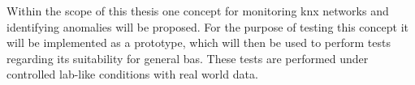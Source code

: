 Within the scope of this thesis one concept for monitoring \gls{knx} networks and identifying anomalies will be proposed. For the purpose of testing this concept it will be implemented as a prototype, which will then be used to perform tests regarding its suitability for general \gls{bas}. These tests are performed under controlled lab-like conditions with real world data.

